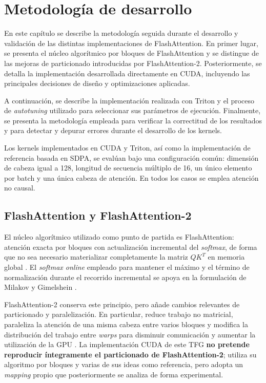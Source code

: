 \chapter{Metodología de desarrollo}

En este capítulo se describe la metodología seguida durante el desarrollo y validación de las distintas implementaciones de FlashAttention. En primer lugar, se presenta el núcleo algorítmico por bloques de FlashAttention y se distingue de las mejoras de particionado introducidas por FlashAttention-2. Posteriormente, se detalla la implementación desarrollada directamente en CUDA, incluyendo las principales decisiones de diseño y optimizaciones aplicadas.

A continuación, se describe la implementación realizada con Triton y el proceso de \textit{autotuning} utilizado para seleccionar sus parámetros de ejecución. Finalmente, se presenta la metodología empleada para verificar la correctitud de los resultados y para detectar y depurar errores durante el desarrollo de los kernels.

Los kernels implementados en CUDA y Triton, así como la implementación de referencia basada en SDPA, se evalúan bajo una configuración común: dimensión de cabeza igual a 128, longitud de secuencia múltiplo de 16, un único elemento por batch y una única cabeza de atención. En todos los casos se emplea atención no causal.


\section{FlashAttention y FlashAttention-2}

El núcleo algorítmico utilizado como punto de partida es FlashAttention: atención exacta por bloques con actualización incremental del \textit{softmax}, de forma que no sea necesario materializar completamente la matriz \(QK^T\) en memoria global \cite{dao2022flashattention}. El \textit{softmax online} empleado para mantener el máximo y el término de normalización durante el recorrido incremental se apoya en la formulación de Milakov y Gimelshein \cite{milakov2018onlineSoftmax}.

FlashAttention-2 conserva este principio, pero añade cambios relevantes de particionado y paralelización. En particular, reduce trabajo no matricial, paraleliza la atención de una misma cabeza entre varios bloques y modifica la distribución del trabajo entre \textit{warps} para disminuir comunicación y aumentar la utilización de la GPU \cite{dao2023flashattention2}. La implementación CUDA de este TFG \textbf{no pretende reproducir íntegramente el particionado de FlashAttention-2}; utiliza su algoritmo por bloques y varias de sus ideas como referencia, pero adopta un \textit{mapping} propio que posteriormente se analiza de forma experimental.

